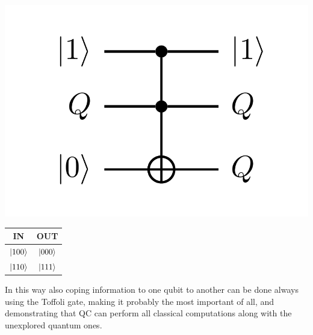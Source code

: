 \begin{minipage}{0.4\textwidth}
    \centering
    \includegraphics[width=\textwidth]{Immagini/Copy.pdf}
\end{minipage}
\begin{minipage}{0.45\textwidth}
    \centering
    \begin{tabular}{c|c}
        \textbf{IN} & \textbf{OUT}\\
        \midrule
        $\ket{100}$ & $\ket{000}$\\
        $\ket{110}$ & $\ket{111}$
    \end{tabular}
\end{minipage}

\noindent
In this way also coping information to one qubit to another can be done always using the Toffoli gate, making it probably the most important of all, and demonstrating that QC can perform all classical computations along with the unexplored quantum ones.